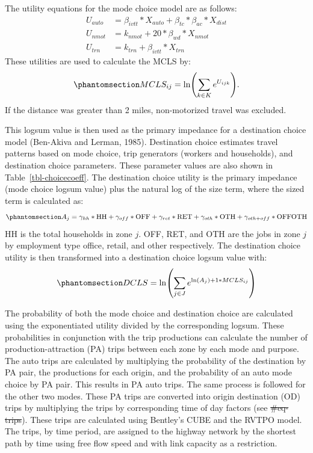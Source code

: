 \documentclass[
  futuretransp,
  submit,
  moreauthors,
]{Definitions/mdpi}
\providecommand{\DIFadd}[1]{{\protect\color{blue}\uwave{#1}}} %
\providecommand{\DIFdel}[1]{{\protect\color{red}\sout{#1}}} %
\providecommand{\DIFaddbegin}{} %
\providecommand{\DIFaddend}{} %
\providecommand{\DIFdelbegin}{} %
\providecommand{\DIFdelend}{} %
\newcommand{\DIFscaledelfig}{0.5}
\newlength{\DIFdelgraphicswidth} %
\newlength{\DIFdelgraphicsheight} %
\newcommand{\DIFaddincludegraphics}[2][]{{\color{blue}\fbox{\DIFOincludegraphics[#1]{#2}}}} %
\newcommand{\DIFdelincludegraphics}[2][]{%
\sbox{\DIFdelgraphicsbox}{\DIFOincludegraphics[#1]{#2}}%
\settoboxwidth{\DIFdelgraphicswidth}{\DIFdelgraphicsbox} %
\settoboxtotalheight{\DIFdelgraphicsheight}{\DIFdelgraphicsbox} %
\scalebox{\DIFscaledelfig}{%
\parbox[b]{\DIFdelgraphicswidth}{\usebox{\DIFdelgraphicsbox}\\[-\baselineskip] \rule{\DIFdelgraphicswidth}{0em}}\llap{\resizebox{\DIFdelgraphicswidth}{\DIFdelgraphicsheight}{%
\setlength{\unitlength}{\DIFdelgraphicswidth}%
\begin{picture}(1,1)%
\thicklines\linethickness{2pt} %
{\color[rgb]{1,0,0}\put(0,0){\framebox(1,1){}}}%
{\color[rgb]{1,0,0}\put(0,0){\line( 1,1){1}}}%
{\color[rgb]{1,0,0}\put(0,1){\line(1,-1){1}}}%
\end{picture}%
}\hspace*{3pt}}} %
} %
\DeclareRobustCommand{\DIFaddbegin}{\DIFOaddbegin \let\includegraphics\DIFaddincludegraphics} %
\DeclareRobustCommand{\DIFaddend}{\DIFOaddend \let\includegraphics\DIFOincludegraphics} %
\DeclareRobustCommand{\DIFdelbegin}{\DIFOdelbegin \let\includegraphics\DIFdelincludegraphics} %
\DeclareRobustCommand{\DIFdelend}{\DIFOaddend \let\includegraphics\DIFOincludegraphics} %
\begin{document}
The utility equations for the mode choice model are as follows: \[
\begin{aligned}
U_{auto} &= \beta_{ivtt} * X_{auto} + \beta_{tc} * \beta_{ac} * X_{dist}\\
U_{nmot} &= k_{nmot} + 20 * \beta_{wd}*X_{nmot}\\
U_{trn} &= k_{trn} + \beta_{ivtt} * X_{trn}
\end{aligned}
\] These utilities are used to calculate the MCLS by:
\begin{equation}\phantomsection\label{eq-mcls}{
MCLS_{ij} = \ln\left(\sum_{k \in K} e^{U_{ijk}}\right).
}\end{equation} If the distance was greater than 2 miles, non-motorized
travel was excluded.

This logsum value is then used as the primary impedance for a
destination choice model (Ben-Akiva and Lerman, 1985). Destination
choice estimates travel patterns based on mode choice, trip generators
(workers and households), and destination choice parameters. These
parameter values are also shown in Table~\ref{tbl-choicecoeff}. The
destination choice utility is the primary impedance (mode choice logsum
value) plus the natural log of the size term, where the sized term is
calculated as: \begin{equation}\phantomsection\label{eq-dcsizeterm}{
A_j = \gamma_{hh} * \mathrm{HH} + \gamma_{off} * \mathrm{OFF} + \gamma_{ret} * \mathrm{RET} + \gamma_{oth} * \mathrm{OTH} + \\ \gamma_{oth+off} * \mathrm{OFFOTH}
}\end{equation} HH is the total households in zone \(j\). OFF, RET, and
OTH are the jobs in zone \(j\) by employment type office, retail, and
other respectively. The destination choice utility is then transformed
into a destination choice logsum value with:
\begin{equation}\phantomsection\label{eq-dcls}{
DCLS = \ln \left(\sum_{j \in J} e^{\ln(A_j) + 1* MCLS_{ij}}\right)
}\end{equation}

The probability of both the mode choice and destination choice are
calculated using the exponentiated utility divided by the corresponding
logsum. These probabilities in conjunction with the trip productions can
calculate the number of production-attraction (PA) trips between each
zone by each mode and purpose. The auto trips are calculated by
multiplying the probability of the destination by PA pair, the
productions for each origin, and the probability of an auto mode choice
by PA pair. This results in PA auto trips. The same process is followed
for the other two modes. These PA trips are converted into origin
destination (OD) trips by multiplying the trips by corresponding time of
day factors (see \DIFdelbegin \DIFdel{\#eq-trips}\DIFdelend \DIFaddbegin \DIFadd{Equation \ref{eq-trips}}\DIFaddend ). These trips are calculated using Bentley's
CUBE and the RVTPO model. The trips, by time period, are assigned to the
highway network by the shortest path by time using free flow speed and
with link capacity as a restriction.
\end{document}
